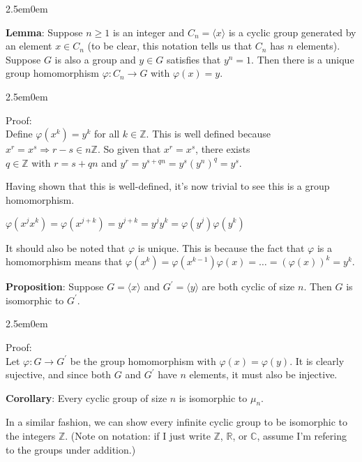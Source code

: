 \documentclass{book}
\newcommand{\hTwo}{%
\color{MidnightBlue}%
   \fontsize{13}{15}\selectfont%
}
\newcommand{\hThree}{%
   \color{PineGreen!85!Orange}
   \fontsize{12}{14}\selectfont%
}
\newenvironment{myIndent}{%
   \begin{adjustwidth}{2.5em}{0em}%
}{%
   \end{adjustwidth}%
}
\newcommand{\blab}[1]{\textbf{#1}}
\newcommand{\retTwo}{\hfill\bigbreak}
\begin{document}
\begin{myIndent}\hTwo
	\blab{Lemma}: Suppose $n \geq 1$ is an integer and $C_n = \langle x \rangle$ is a cyclic group generated by an element $x \in C_n$ (to be clear, this notation tells us that $C_n$ has $n$ elements). Suppose $G$ is also a group and $y \in G$ satisfies that $y^n = 1$. Then there is a unique group homomorphism $\varphi: C_n \longrightarrow G$ with $\varphi(x) = y$.

	\begin{myIndent}\hThree
		Proof:\\
		Define $\varphi(x^k) = y^k$ for all $k \in \mathbb{Z}$. This is well defined because\\ $x^r = x^s \Longrightarrow r - s \in n\mathbb{Z}$. So given that $x^r = x^s$, there exists\\ $q \in \mathbb{Z}$ with $r = s + qn$ and $y^r = y^{s + qn} = y^s(y^n)^q = y^s$.\retTwo

		Having shown that this is well-defined, it's now trivial to see this is a group\\ homomorphism.

		{\centering $\varphi(x^jx^k) = \varphi(x^{j + k}) = y^{j+k} = y^jy^k = \varphi(y^j)\varphi(y^k)$ \retTwo\par}

		It should also be noted that $\varphi$ is unique. This is because the fact that $\varphi$ is a\\ homomorphism means that $\varphi(x^k) = \varphi(x^{k-1})\varphi(x) = \ldots = (\varphi(x))^k = y^k$.
	\end{myIndent}

	\blab{Proposition}: Suppose $G = \langle x \rangle$ and $G^\prime = \langle y \rangle$ are both cyclic of size $n$. Then $G$ is isomorphic to $G^\prime$.\retTwo

	\begin{myIndent}\hThree
		Proof:\\
		Let $\varphi: G\longrightarrow G^\prime$ be the group homomorphism with $\varphi(x) = \varphi(y)$. It is clearly sujective, and since both $G$ and $G^\prime$ have $n$ elements, it must also be injective.\retTwo
	\end{myIndent}

	\blab{Corollary}: Every cyclic group of size $n$ is isomorphic to $\mu_n$.\retTwo
\end{myIndent}

In a similar fashion, we can show every infinite cyclic group to be isomorphic to the integers $\mathbb{Z}$. (Note on notation: if I just write $\mathbb{Z}$, $\mathbb{R}$, or $\mathbb{C}$, assume I'm refering to the groups under addition.)\newpage
\end{document}
